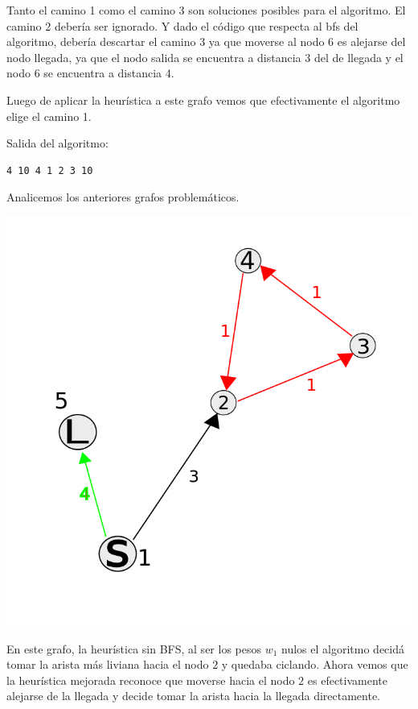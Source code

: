 Tanto el camino 1 como el camino 3 son soluciones posibles para el algoritmo. El camino 2 deber\'ia ser ignorado. Y dado el c\'odigo que respecta al bfs del algoritmo, deber\'ia descartar el camino 3 ya que moverse al nodo $6$ es alejarse del nodo llegada, ya que el nodo salida se encuentra a distancia $3$ del de llegada y el nodo $6$ se encuentra a distancia $4$.

\vspace{10mm}

Luego de aplicar la heur\'istica a este grafo vemos que efectivamente el algoritmo elige el camino 1.

\vspace{5mm}
Salida del algoritmo:

\begin{lstlisting}[frame=single]
4 10 4 1 2 3 10
\end{lstlisting}

Analicemos los anteriores grafos problem\'aticos.

\begin{center}
\includegraphics[scale=0.4]{img/cicloNumerado.png}
\end{center}

En este grafo, la heur\'istica sin BFS, al ser los pesos $w_1$ nulos el algoritmo decid\'a tomar la arista m\'as liviana hacia el nodo $2$ y quedaba ciclando. Ahora vemos que la heur\'istica mejorada reconoce que moverse hacia el nodo $2$ es efectivamente alejarse de la llegada y decide tomar la arista hacia la llegada directamente.


